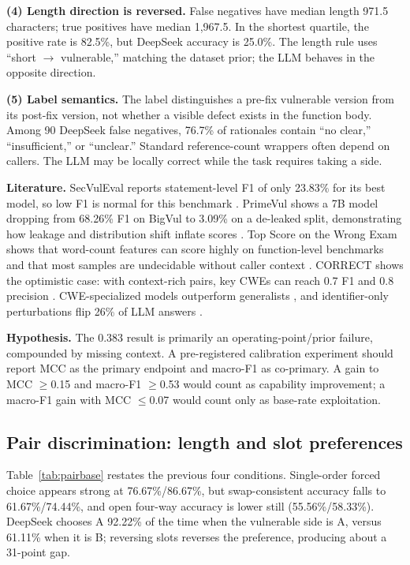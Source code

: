 \documentclass[conference]{IEEEtran}
\begin{document}
\textbf{(4) Length direction is reversed.} False negatives have median length 971.5 characters; true positives have median 1,967.5. In the shortest quartile, the positive rate is 82.5\%, but DeepSeek accuracy is 25.0\%. The length rule uses ``short $\rightarrow$ vulnerable,'' matching the dataset prior; the LLM behaves in the opposite direction.

\textbf{(5) Label semantics.} The label distinguishes a pre-fix vulnerable version from its post-fix version, not whether a visible defect exists in the function body. Among 90 DeepSeek false negatives, 76.7\% of rationales contain ``no clear,'' ``insufficient,'' or ``unclear.'' Standard reference-count wrappers often depend on callers. The LLM may be locally correct while the task requires taking a side.

\textbf{Literature.} SecVulEval reports statement-level F1 of only 23.83\% for its best model, so low F1 is normal for this benchmark \cite{ahmed2026secvuleval}. PrimeVul shows a 7B model dropping from 68.26\% F1 on BigVul to 3.09\% on a de-leaked split, demonstrating how leakage and distribution shift inflate scores \cite{ding2025primevul}. Top Score on the Wrong Exam shows that word-count features can score highly on function-level benchmarks and that most samples are undecidable without caller context \cite{risse2025topscore}. CORRECT shows the optimistic case: with context-rich pairs, key CWEs can reach 0.7 F1 and 0.8 precision \cite{li2025correct}. CWE-specialized models outperform generalists \cite{alatiq2024specialist}, and identifier-only perturbations flip 26\% of LLM answers \cite{ull2024}.

\textbf{Hypothesis.} The 0.383 result is primarily an operating-point/prior failure, compounded by missing context. A pre-registered calibration experiment should report MCC as the primary endpoint and macro-F1 as co-primary. A gain to MCC $\ge$0.15 and macro-F1 $\ge$0.53 would count as capability improvement; a macro-F1 gain with MCC $\le$0.07 would count only as base-rate exploitation.

\subsection{Pair discrimination: length and slot preferences}
\label{sec:gap-pair}

Table~\ref{tab:pairbase} restates the previous four conditions. Single-order forced choice appears strong at 76.67\%/86.67\%, but swap-consistent accuracy falls to 61.67\%/74.44\%, and open four-way accuracy is lower still (55.56\%/58.33\%). DeepSeek chooses A 92.22\% of the time when the vulnerable side is A, versus 61.11\% when it is B; reversing slots reverses the preference, producing about a 31-point gap.
\end{document}
